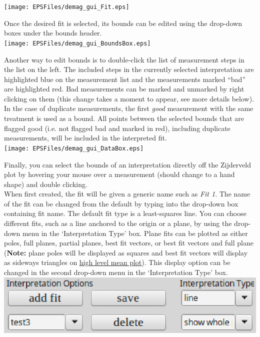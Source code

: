 \documentclass[11pt]{book}
\begin{document}
{{\texttt{[image: EPSFiles/demag\_gui\_Fit.eps]}

\noindent Once the desired fit is selected, its bounds can be edited using the drop-down boxes under the bounds header.\\

\texttt{[image: EPSFiles/demag\_gui\_BoundsBox.eps]}

\noindent Another way to edit bounds is to double-click the list of measurement steps in the list on the left. The included steps in the currently selected interpretation are highlighted blue on the measurement list and the measurements marked ``bad'' are highlighted red. Bad measurements can be marked and unmarked by right clicking on them (this change takes a moment to appear, see more details below).  In the case of duplicate measurements, the first \emph{good} measurement with the same treatment is used as a bound. All points between the selected bounds that are flagged good (i.e. not flagged bad and marked in red), including duplicate measurements, will be included in the interpreted fit.\\

\texttt{[image: EPSFiles/demag\_gui\_DataBox.eps]}

\noindent Finally, you can select the bounds of an interpretation directly off the Zijderveld plot by hovering your mouse over a measurement (should change to a hand shape) and double clicking.\\

\noindent When first created, the fit will be given a generic name such as
\emph{Fit 1}. The name of the fit can be changed from the default by typing into the drop-down box containing fit name. The default fit type is a least-squares line. You can choose different fits, such as a line anchored to the origin or a plane, by using the drop-down menu in the `Interpretation Type' box. Plane fits can be plotted as either poles, full planes, partial planes, best fit vectors, or best fit vectors and full plane ({\bf Note:} plane poles will be displayed as squares and best fit vectors will display as sideways triangles on \hyperref[higher-level-plots-and-interpretation]{high level mean plot}). This display option can be changed in the second drop-down menu in the `Interpretation Type' box.\\

\includegraphics[width=10 cm]{EPSFiles/demag_gui_SpecimenMeanType.eps}

}}
\end{document}
